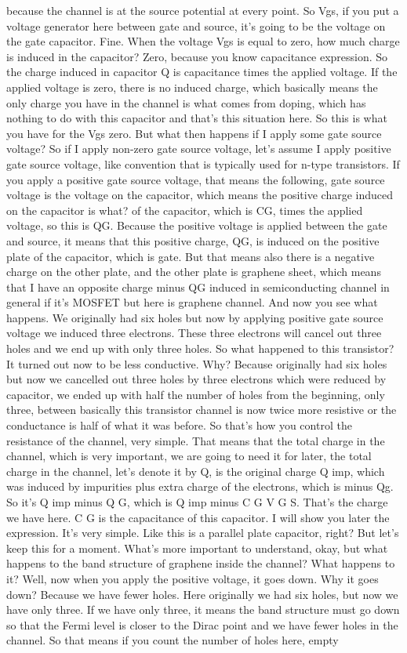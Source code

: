 because the channel is at the source potential at every point. So Vgs, if you put a voltage generator here between gate and source, it's going to be the voltage on the gate capacitor. Fine. When the voltage Vgs is equal to zero, how much charge is induced in the capacitor? Zero, because you know capacitance expression. So the charge induced in capacitor Q is capacitance times the applied voltage. If the applied voltage is zero, there is no induced charge, which basically means the only charge you have in the channel is what comes from doping, which has nothing to do with this capacitor and that's this situation here. So this is what you have for the Vgs zero. But what then happens if I apply some gate source voltage? So if I apply non-zero gate source voltage, let's assume I apply positive gate source voltage, like convention that is typically used for n-type transistors. If you apply a positive gate source voltage, that means the following, gate source voltage is the voltage on the capacitor, which means the positive charge induced on the capacitor is what? of the capacitor, which is CG, times the applied voltage, so this is QG. Because the positive voltage is applied between the gate and source, it means that this positive charge, QG, is induced on the positive plate of the capacitor, which is gate. But that means also there is a negative charge on the other plate, and the other plate is graphene sheet, which means that I have an opposite charge minus QG induced in semiconducting channel in general if it's MOSFET but here is graphene channel. And now you see what happens. We originally had six holes but now by applying positive gate source voltage we induced three electrons. These three electrons will cancel out three holes and we end up with only three holes. So what happened to this transistor? It turned out now to be less conductive. Why? Because originally had six holes but now we cancelled out three holes by three electrons which were reduced by capacitor, we ended up with half the number of holes from the beginning, only three, between basically this transistor channel is now twice more resistive or the conductance is half of what it was before. So that's how you control the resistance of the channel, very simple. That means that the total charge in the channel, which is very important, we are going to need it for later, the total charge in the channel, let's denote it by Q, is the original charge Q imp, which was induced by impurities plus extra charge of the electrons, which is minus Qg. So it's Q imp minus Q G, which is Q imp minus C G V G S. That's the charge we have here. C G is the capacitance of this capacitor. I will show you later the expression. It's very simple. Like this is a parallel plate capacitor, right? But let's keep this for a moment. What's more important to understand, okay, but what happens to the band structure of graphene inside the channel? What happens to it? Well, now when you apply the positive voltage, it goes down. Why it goes down? Because we have fewer holes. Here originally we had six holes, but now we have only three. If we have only three, it means the band structure must go down so that the Fermi level is closer to the Dirac point and we have fewer holes in the channel. So that means if you count the number of holes here, empty 